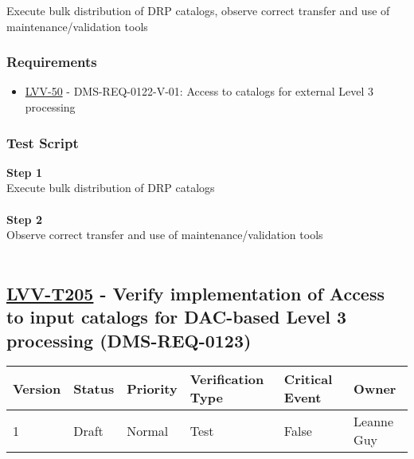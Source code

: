 Execute bulk distribution of DRP catalogs, observe correct transfer and
use of maintenance/validation tools

\hypertarget{requirements-104}{%
\subsubsection{Requirements}\label{requirements-104}}

\begin{itemize}
\tightlist
\item
  \href{https://jira.lsstcorp.org/browse/LVV-50}{LVV-50} -
  DMS-REQ-0122-V-01: Access to catalogs for external Level 3 processing
\end{itemize}

\hypertarget{test-script-104}{%
\subsubsection{Test Script}\label{test-script-104}}

\textbf{Step 1}\\
Execute bulk distribution of DRP catalogs\\
~\\
\textbf{Step 2}\\
Observe correct transfer and use of maintenance/validation tools\\
~\\

\hypertarget{lvv-t205---verify-implementation-of-access-to-input-catalogs-for-dac-based-level-3-processing-dms-req-0123}{%
\subsection{\texorpdfstring{\href{https://jira.lsstcorp.org/secure/Tests.jspa\#/testCase/LVV-T205}{LVV-T205}
- Verify implementation of Access to input catalogs for DAC-based Level
3 processing
(DMS-REQ-0123)}{LVV-T205 - Verify implementation of Access to input catalogs for DAC-based Level 3 processing (DMS-REQ-0123)}}\label{lvv-t205---verify-implementation-of-access-to-input-catalogs-for-dac-based-level-3-processing-dms-req-0123}}

\begin{longtable}[]{@{}llllll@{}}
\toprule
Version & Status & Priority & Verification Type & Critical Event &
Owner\tabularnewline
\midrule
\endhead
1 & Draft & Normal & Test & False & Leanne Guy\tabularnewline
\bottomrule
\end{longtable}

